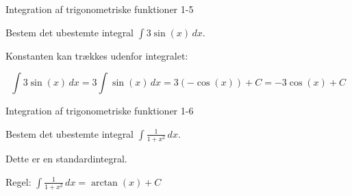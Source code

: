 \documentclass{article}
\begin{document}
\newpage

\begin{exercise}{Integration af trigonometriske funktioner 1-5}

Bestem det ubestemte integral $\int 3\sin(x) \, dx$.


\hint

Konstanten kan trækkes udenfor integralet:

\hint
\[
\int 3\sin(x) \, dx = 3 \int \sin(x) \, dx = 3(-\cos(x)) + C = -3\cos(x) + C
\]

\end{exercise}

\newpage

\begin{exercise}{Integration af trigonometriske funktioner 1-6}

Bestem det ubestemte integral $\int \frac{1}{1 + x^2} \, dx$.


\hint

Dette er en standardintegral.

\hint

Regel: $\int \frac{1}{1 + x^2} \, dx = \arctan(x) + C$

\end{exercise}
\end{document}
